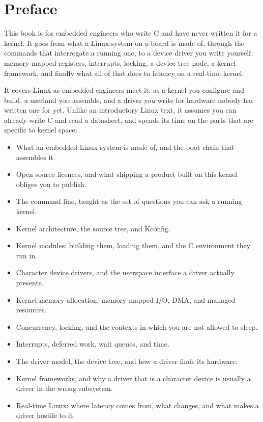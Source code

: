 
\chapter{Preface}

This book is for embedded engineers who write C and have never written it for a kernel. It goes
from what a Linux system on a board is made of, through the commands that interrogate a running
one, to a device driver you write yourself: memory-mapped registers, interrupts, locking, a device
tree node, a kernel framework, and finally what all of that does to latency on a real-time kernel.

It covers Linux as embedded engineers meet it: as a kernel you configure and build, a userland you
assemble, and a driver you write for hardware nobody has written one for yet. Unlike an
introductory Linux text, it assumes you can already write C and read a datasheet, and spends its
time on the parts that are specific to kernel space:
\begin{itemize}
  \item What an embedded Linux system is made of, and the boot chain that assembles it.
  \item Open source licences, and what shipping a product built on this kernel obliges you to
    publish.
  \item The command line, taught as the set of questions you can ask a running kernel.
  \item Kernel architecture, the source tree, and Kconfig.
  \item Kernel modules: building them, loading them, and the C environment they run in.
  \item Character device drivers, and the userspace interface a driver actually presents.
  \item Kernel memory allocation, memory-mapped I/O, DMA, and managed resources.
  \item Concurrency, locking, and the contexts in which you are not allowed to sleep.
  \item Interrupts, deferred work, wait queues, and time.
  \item The driver model, the device tree, and how a driver finds its hardware.
  \item Kernel frameworks, and why a driver that is a character device is usually a driver in the
    wrong subsystem.
  \item Real-time Linux: where latency comes from, what  changes, and what makes a
    driver hostile to it.
\end{itemize}

